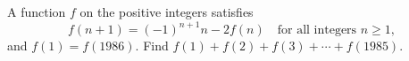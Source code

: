 A function $f$ on the positive integers satisfies
\[f(n+1)=(-1)^{n+1}n-2f(n)\quad\text{for all integers } n\ge1,\]
and $f(1)=f(1986)$. Find $f(1)+f(2)+f(3)+\cdots+f(1985)$.
